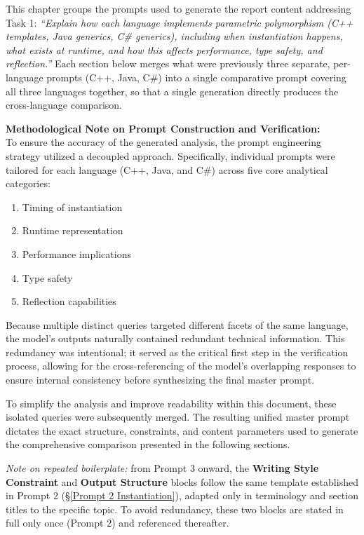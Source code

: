 \documentclass[11pt]{report}
\begin{document}
This chapter groups the prompts used to generate the report content
addressing Task 1: \textit{``Explain how each language implements parametric
polymorphism (C++ templates, Java generics, C\# generics), including when
instantiation happens, what exists at runtime, and how this affects
performance, type safety, and reflection.''} Each section below merges what
were previously three separate, per-language prompts (C++, Java, C\#) into a
single comparative prompt covering all three languages together, so that a
single generation directly produces the cross-language comparison.

\vspace{0.5cm}
\noindent\textbf{Methodological Note on Prompt Construction and Verification:}\\
To ensure the accuracy of the generated analysis, the prompt engineering strategy utilized a decoupled approach. Specifically,
individual prompts were tailored for each language (C++, Java, and C\#) across five core analytical categories:
\begin{enumerate}
    \item Timing of instantiation
    \item Runtime representation
    \item Performance implications
    \item Type safety
    \item Reflection capabilities
\end{enumerate}

Because multiple distinct queries targeted different facets of the same language, the model's outputs naturally contained
redundant technical information. This redundancy was intentional; it served as the critical first step in the verification
process, allowing for the cross-referencing of the model's overlapping responses to ensure internal consistency before
synthesizing the final master prompt.

To simplify the analysis and improve readability within this document, these isolated queries were subsequently merged.
The resulting unified master prompt dictates the exact structure,
constraints, and content parameters used to
generate the comprehensive comparison presented in the following sections.

\noindent\textit{Note on repeated boilerplate:} from Prompt 3 onward, the
\textbf{Writing Style Constraint} and \textbf{Output Structure} blocks follow
the same template established in Prompt 2 (\S\ref{Prompt 2 Instantiation}),
adapted only in terminology and section titles to the specific topic. To avoid
redundancy, these two blocks are stated in full only once (Prompt 2) and
referenced thereafter.
\end{document}
